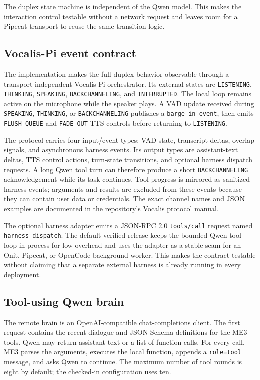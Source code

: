 \documentclass[sigconf,nonacm]{acmart}
\begin{document}
The duplex state machine is independent of the Qwen model. This makes the
interaction control testable without a network request and leaves room for a
Pipecat transport to reuse the same transition logic.

\subsection{Vocalis-Pi event contract}

The implementation makes the full-duplex behavior observable through a
transport-independent Vocalis-Pi orchestrator. Its external states are
\texttt{LISTENING}, \texttt{THINKING}, \texttt{SPEAKING},
\texttt{BACKCHANNELING}, and \texttt{INTERRUPTED}. The local loop remains
active on the microphone while the speaker plays. A VAD update received during
\texttt{SPEAKING}, \texttt{THINKING}, or \texttt{BACKCHANNELING} publishes a
\texttt{barge\_in\_event}, then emits \texttt{FLUSH\_QUEUE} and
\texttt{FADE\_OUT} TTS controls before returning to \texttt{LISTENING}.

The protocol carries four input/event types: VAD state, transcript deltas,
overlap signals, and asynchronous harness events. Its output types are
assistant-text deltas, TTS control actions, turn-state transitions, and
optional harness dispatch requests. A long Qwen tool turn can therefore
produce a short \texttt{BACKCHANNELING} acknowledgement while its task
continues. Tool progress is mirrored as sanitized harness events; arguments
and results are excluded from these events because they can contain user data
or credentials. The exact channel names and JSON examples are documented in
the repository's Vocalis protocol manual.

The optional harness adapter emits a JSON-RPC 2.0 \texttt{tools/call} request
named \texttt{harness\_dispatch}. The default verified release keeps the
bounded Qwen tool loop in-process for low overhead and uses the adapter as a
stable seam for an Onit, Pipecat, or OpenCode background worker. This makes
the contract testable without claiming that a separate external harness is
already running in every deployment.

\subsection{Tool-using Qwen brain}

The remote brain is an OpenAI-compatible chat-completions client. The first
request contains the recent dialogue and JSON Schema definitions for the ME3
tools. Qwen may return assistant text or a list of function calls. For every
call, ME3 parses the arguments, executes the local function, appends a
\texttt{role=tool} message, and asks Qwen to continue. The maximum number of
tool rounds is eight by default; the checked-in
configuration uses ten.
\end{document}
